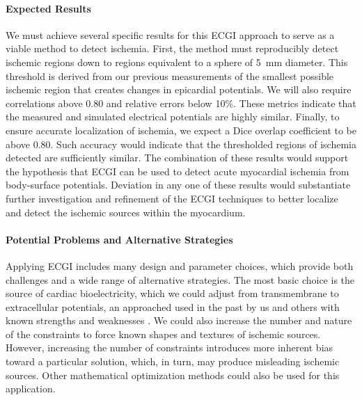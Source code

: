 \paragraph{Expected Results} We must achieve several specific results for
this ECGI approach to serve as a viable method to detect ischemia. First,
the method must reproducibly detect ischemic regions down to regions
equivalent to a sphere of 5~mm diameter. This threshold is derived from our
previous measurements of the smallest possible ischemic region that creates
changes in epicardial potentials.  We will also require correlations above
0.80 and relative errors below 10\%. These metrics indicate that the
measured and simulated electrical potentials are highly similar. Finally,
to ensure accurate localization of ischemia, we expect a Dice overlap
coefficient to be above 0.80. Such accuracy would indicate that the
thresholded regions of ischemia detected are sufficiently similar. The
combination of these results would support the hypothesis that ECGI can be
used to detect acute myocardial ischemia from body-surface
potentials. Deviation in any one of these results would substantiate
further investigation and refinement of the ECGI techniques to better
localize and detect the ischemic sources within the myocardium.

\paragraph{Potential Problems and Alternative Strategies} Applying ECGI
includes many design and parameter choices, which provide both challenges
and a wide range of alternative strategies. The most basic choice is the
source of cardiac bioelectricity, which we could adjust from transmembrane
to extracellular potentials, an approached used in the past by us and
others with known strengths and weaknesses \cite{RSM:Mac95,RSM:Ost97b}. We
could also increase the number and nature of the constraints to force known
shapes and textures of ischemic sources. However, increasing the number of
constraints introduces more inherent bias toward a particular solution,
which, in turn, may produce misleading ischemic sources. Other mathematical
optimization methods could also be used for this
application\cite{RSM:Ahm94,RSM:Bro96b,RSM:Ahm98,
  RSM:Gha2001,RSM:Ost92,RSM:Ost97c,RSM:Ram2003,RSM:Clu2018}.



